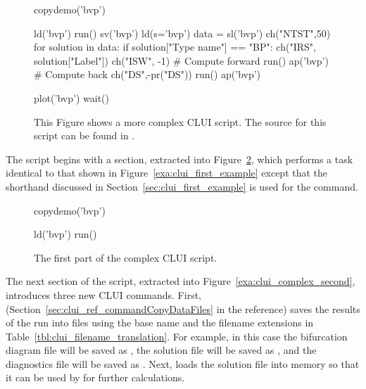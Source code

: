 \begin{figure}[htbp]
{\small \begin{center} \begin{boxedverbatim}
copydemo('bvp')

ld('bvp')
run()
sv('bvp')
ld(s='bvp')
data = sl('bvp')
ch("NTST",50)
for solution in data:
    if solution["Type name"] == "BP":
        ch("IRS", solution["Label"])
        ch("ISW", -1)
        # Compute forward
        run()
        ap('bvp')
        # Compute back
        ch("DS",-pr("DS"))
        run()
        ap('bvp')

plot('bvp')
wait()
\end{boxedverbatim}
\end{center} 
}
\caption[A complex example of a \AUTOc CLUI script.]
{This Figure shows a more complex \AUTOc CLUI script.
The source for this script can be found in .
}
\label{exa:clui_complex_script}
\end{figure}

The script begins with a section, extracted into 
Figure~\ref{exa:clui_complex_first}, which performs a task 
identical to that shown in Figure~\ref{exa:clui_first_example}
except that the shorthand discussed in 
Section~\ref{sec:clui_first_example} is used for the 
 command.

\begin{figure}[htbp]
{\small \begin{center} \begin{boxedverbatim}
copydemo('bvp')

ld('bvp')
run()
\end{boxedverbatim}
\end{center} 
}
\caption[The first part of the  complex \AUTOc CLUI script.]
{The first part of the  complex \AUTOc CLUI script.}
\label{exa:clui_complex_first}
\end{figure}

The next section of the script, extracted into 
Figure~\ref{exa:clui_complex_second}, introduces
three new \AUTOc CLUI commands.  First, 
(Section~\ref{sec:clui_ref_commandCopyDataFiles} in the reference)
saves the results of the \AUTOc run into files using
the base name  and the filename extensions in
Table~\ref{tbl:clui_filename_translation}.  For example,
in this case the bifurcation diagram file 
will be saved as , 
the solution file 
will be saved as , and  
the diagnostics file 
will be saved as .  Next, 
loads the solution file  into memory
so that it can be used by \AUTOc for further calculations.

